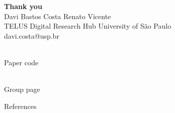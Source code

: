 \documentclass[aspectratio=169]{beamer}
\begin{document}
\begin{frame}[plain]
  \vfill\centering
  {\Large\bfseries Thank you}\\[1.2em]
  {\normalsize Davi Bastos Costa \quad Renato Vicente}\\[0.4em]
  {\small\color{black!50} TELUS Digital Research Hub \quad University of S\~{a}o Paulo}\\[0.6em]
  {\small\color{black!45} davi.costa@usp.br}\\[1.2em]
  \begin{minipage}[t]{0.28\textwidth}
    \centering
    {\setlength{\fboxsep}{0.15em}\colorbox{white}{\color{black}}}\\[0.4em]
    {\scriptsize\color{black!50} Paper code}
  \end{minipage}\hspace{2em}
  \begin{minipage}[t]{0.28\textwidth}
    \centering
    {\setlength{\fboxsep}{0.15em}\colorbox{white}{\color{black}}}\\[0.4em]
    {\scriptsize\color{black!50} Group page}
  \end{minipage}
  \vfill
\end{frame}

\begin{frame}[allowframebreaks]{References}
  
  
\end{frame}
\end{document}
